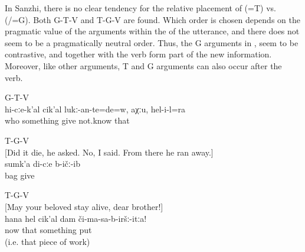 In Sanzhi, there is no clear tendency for the relative placement of  (=T) vs.  (\slash {}=G). Both G-T-V and T-G-V are found. Which order is chosen depends on the pragmatic value of the arguments within the  of the utterance, and there does not seem to be a pragmatically neutral order. Thus, the G arguments in ,  seem to be contrastive, and together with the verb form part of the new information.  Moreover, like other arguments, T and G arguments can also occur after the verb.
%
\begin{exe}
	\ex	G-T-V\\\label{ex:‎‎He had also to give something to somebody, I don't know GTV}%
	\gll	hi-cːe-k'al	cik'al	lukː-an-te=de=w,	aχːu,	hel-i-l=ra\\
		who	something	give	not.know that\\
	\glt	{}

	\ex	T-G-V\\\label{ex:‎‎From there he ran away, gave me his bag TGV}%
		[Did it die, he asked. No, I said. ‎‎From there he ran away.]\\
	\gll	sumk'a	di-cːe	b-ičː-ib\\
		bag		give\\
	\glt	{}

	\ex	T-G-V\\\label{ex:Do not put that thing on me!}%
		‎[May your beloved stay alive, dear brother!]\\
	\gll	hana	hel	cik'al	dam	či-ma-sa-b-iršː-itːa!\\
		now	that	something		put\\
	\glt	{} (i.e. that piece of work)
\end{exe}

